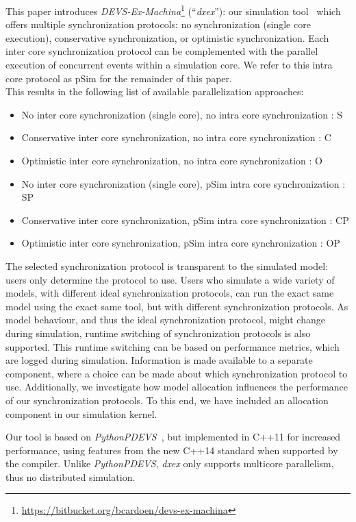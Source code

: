 This paper introduces \textit{DEVS-Ex-Machina}\footnote{\url{https://bitbucket.org/bcardoen/devs-ex-machina}} (``\textit{dxex}''): our simulation tool~\cite{dxex} which offers multiple synchronization protocols: no synchronization (single core execution), conservative synchronization, or optimistic synchronization. Each inter core synchronization protocol can be complemented with the parallel execution of concurrent events within a simulation core. We refer to this intra core protocol as pSim for the remainder of this paper. \\
This results in the following list of available parallelization approaches:\\
\begin{itemize}
\item No inter core synchronization (single core), no intra core synchronization : S
\item Conservative inter core synchronization, no intra core synchronization : C
\item Optimistic inter core synchronization, no intra core synchronization : O
\item No inter core synchronization (single core), pSim intra core synchronization : SP
\item Conservative inter core synchronization, pSim intra core synchronization : CP
\item Optimistic inter core synchronization, pSim intra core synchronization : OP
\end{itemize}
The selected synchronization protocol is transparent to the simulated model: users only determine the protocol to use.
Users who simulate a wide variety of models, with different ideal synchronization protocols, can run the exact same model using the exact same tool, but with different synchronization protocols.
As model behaviour, and thus the ideal synchronization protocol, might change during simulation, runtime switching of synchronization protocols is also supported.
This runtime switching can be based on performance metrics, which are logged during simulation.
Information is made available to a separate component, where a choice can be made about which synchronization protocol to use. %
Additionally, we investigate how model allocation influences the performance of our synchronization protocols.
To this end, we have included an allocation component in our simulation kernel.

Our tool is based on \textit{PythonPDEVS}~\cite{PythonPDEVS}, but implemented in C++11 for increased performance, using features from the new C++14 standard when supported by the compiler.
Unlike \textit{PythonPDEVS}, \textit{dxex} only supports multicore parallelism, thus no distributed simulation.

